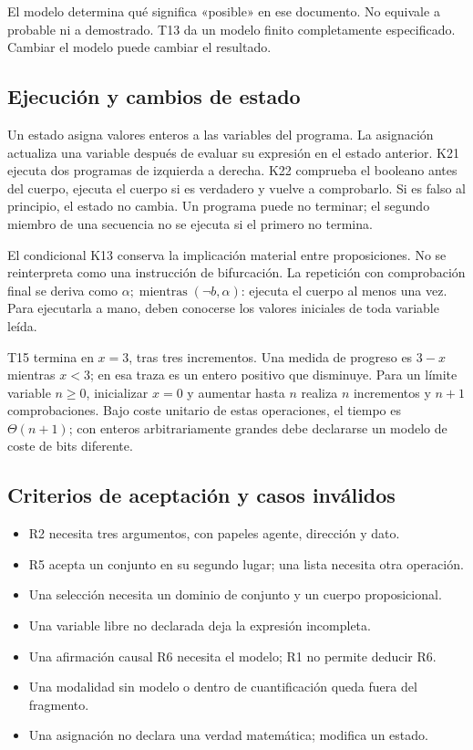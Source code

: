 El modelo determina qué significa «posible» en ese documento. No equivale a
probable ni a demostrado. T13 da un modelo finito completamente especificado.
Cambiar el modelo puede cambiar el resultado.

\subsection{Ejecución y cambios de estado}
Un estado asigna valores enteros a las variables del programa. La asignación
actualiza una variable después de evaluar su expresión en el estado anterior.
K21 ejecuta dos programas de izquierda a derecha. K22 comprueba el booleano
antes del cuerpo, ejecuta el cuerpo si es verdadero y vuelve a comprobarlo.
Si es falso al principio, el estado no cambia. Un programa puede no terminar;
el segundo miembro de una secuencia no se ejecuta si el primero no termina.

El condicional K13 conserva la implicación material entre proposiciones. No se
reinterpreta como una instrucción de bifurcación. La repetición con comprobación
final se deriva como \(\alpha;\operatorname{mientras}(\neg b,\alpha)\): ejecuta
el cuerpo al menos una vez. Para ejecutarla a mano, deben conocerse los valores
iniciales de toda variable leída.

T15 termina en \(x=3\), tras tres incrementos. Una medida de progreso es
\(3-x\) mientras \(x<3\); en esa traza es un entero positivo que disminuye.
Para un límite variable \(n\geq0\), inicializar \(x=0\) y aumentar hasta \(n\)
realiza \(n\) incrementos y \(n+1\) comprobaciones. Bajo coste unitario de estas
operaciones, el tiempo es \(\Theta(n+1)\); con enteros arbitrariamente grandes
debe declararse un modelo de coste de bits diferente.

\subsection{Criterios de aceptación y casos inválidos}
\begin{itemize}
\item R2 necesita tres argumentos, con papeles agente, dirección y dato.
\item R5 acepta un conjunto en su segundo lugar; una lista necesita otra operación.
\item Una selección necesita un dominio de conjunto y un cuerpo proposicional.
\item Una variable libre no declarada deja la expresión incompleta.
\item Una afirmación causal R6 necesita el modelo; R1 no permite deducir R6.
\item Una modalidad sin modelo o dentro de cuantificación queda fuera del fragmento.
\item Una asignación no declara una verdad matemática; modifica un estado.
\end{itemize}
